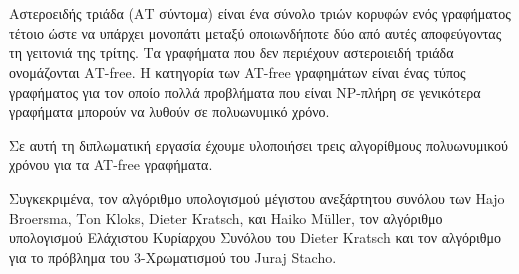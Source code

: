 \chapter*{\abstractname}
\addstarredchapter{\abstractname} %
\makecseabstract


\noindent Αστεροειδής τριάδα (ΑΤ σύντομα) είναι ένα σύνολο τριών κορυφών ενός γραφήματος τέτοιο ώστε να υπάρχει μονοπάτι μεταξύ οποιωνδήποτε δύο από αυτές αποφεύγοντας τη γειτονιά της τρίτης. Τα γραφήματα που δεν περιέχουν αστεροιειδή τριάδα ονομάζονται ΑT-free. Η κατηγορία των AT-free γραφημάτων είναι ένας τύπος γραφήματος για τον οποίο πολλά προβλήματα που είναι NP-πλήρη σε γενικότερα γραφήματα μπορούν να λυθούν σε πολυωνυμικό χρόνο.

Σε αυτή τη διπλωματική εργασία έχουμε υλοποιήσει τρεις αλγορίθμους πολυωνυμικού χρόνου για τα AT-free γραφήματα.

Συγκεκριμένα, τον αλγόριθμο υπολογισμού μέγιστου ανεξάρτητου συνόλου των Ηajo Βroersma, Τon Κloks, Dieter Kratsch, 
και Ηaiko Μüller\cite{at-free-independent-sets}, τον αλγόριθμο υπολογισμού Ελάχιστου Κυρίαρχου Συνόλου του Dieter Kratsch\cite{at-free-domination} και τον αλγόριθμο για το πρόβλημα του 3-Χρωματισμού του Juraj Stacho\cite{at-free-3-colouring}. 
